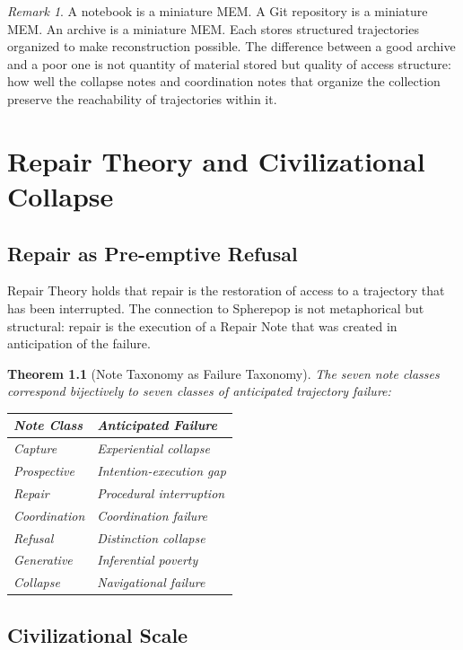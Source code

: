 \documentclass[12pt, a4paper, openany]{book}
\theoremstyle{plain}
\newtheorem{theorem}{Theorem}[chapter]
\theoremstyle{definition}
\theoremstyle{remark}
\newtheorem{remark}[theorem]{Remark}
\begin{document}
\begin{remark}
A notebook is a miniature MEM. A Git repository is a miniature
MEM. An archive is a miniature MEM. Each stores structured
trajectories organized to make reconstruction possible. The difference between
a good archive and a poor one is not quantity of material stored but quality
of access structure: how well the collapse notes and coordination notes that
organize the collection preserve the reachability of trajectories within it.
\end{remark}

\chapter{Repair Theory and Civilizational Collapse}

\section{Repair as Pre-emptive Refusal}

Repair Theory holds that repair is the restoration of access to a trajectory
that has been interrupted. The connection to Spherepop is not metaphorical but
structural: repair is the execution of a Repair Note that was created in
anticipation of the failure.

\begin{theorem}[Note Taxonomy as Failure Taxonomy]
The seven note classes correspond bijectively to seven classes of anticipated
trajectory failure:
\begin{center}
\begin{tabular}{ll}
\toprule
Note Class & Anticipated Failure \\
\midrule
Capture & Experiential collapse \\
Prospective & Intention-execution gap \\
Repair & Procedural interruption \\
Coordination & Coordination failure \\
Refusal & Distinction collapse \\
Generative & Inferential poverty \\
Collapse & Navigational failure \\
\bottomrule
\end{tabular}
\end{center}
\end{theorem}

\section{Civilizational Scale}
\end{document}
